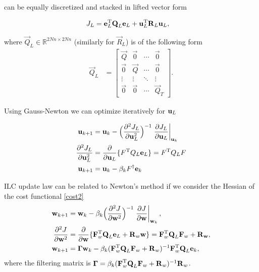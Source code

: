 \noindent can be equally discretized and stacked in lifted vector form

\begin{equation}
\begin{aligned}
J_L &= \boldsymbol{\mathrm{e}}_L^{\mathrm{T}}\boldsymbol{\mathrm{Q}}_L\boldsymbol{\mathrm{e}}_L + \boldsymbol{\mathrm{u}}_L^{\mathrm{T}}\boldsymbol{\mathrm{R}}_L\boldsymbol{\mathrm{u}}_L,
\end{aligned}
\label{costFunctional}
\end{equation}

\noindent where $\vec{Q}_L \in \mathbb{R}^{2Nn \times 2Nn}$ (similarly for $\vec{R}_L$) is of the following form
%
\begin{equation*}
\begin{aligned}
 \vec{Q}_L &= 
 \begin{bmatrix}
  \vec{Q} & \vec{0} & \cdots & \vec{0} \\
  \vec{0} & \vec{Q} & \cdots & \vec{0} \\
  \vdots  & \vdots  & \ddots & \vdots  \\
  \vec{0} & \vec{0} & \cdots & \vec{Q}_T
 \end{bmatrix}.
\end{aligned}
\end{equation*}

\noindent Using Gauss-Newton we can optimize iteratively for $\boldsymbol{\mathrm{u}}_L$

\begin{equation}
\begin{aligned}
\boldsymbol{\mathrm{u}}_{k+1} &= \boldsymbol{\mathrm{u}}_k - \Big(\frac{\partial^{2}J_L}{\partial\boldsymbol{\mathrm{u}}^{2}_L}\Big)^{-1}\left.\frac{\partial{J_L}}{\partial{\boldsymbol{\mathrm{u}}_L}}\right|_{\boldsymbol{\mathrm{u}}_k} \\
\frac{\partial^{2}J_L}{\partial\boldsymbol{\mathrm{u}}^{2}_L} &= \frac{\partial}{\partial\boldsymbol{\mathrm{u}}_L}\{F^{\mathrm{T}}Q_L\boldsymbol{\mathrm{e}}_L\} = F^{\mathrm{T}}Q_LF \\
\boldsymbol{\mathrm{u}}_{k+1} &= \boldsymbol{\mathrm{u}}_k - \beta_kF^{\dagger}\boldsymbol{\mathrm{e}}_k
\end{aligned}
\label{ILCnewtonsMethod}
\end{equation}

\noindent ILC update law can be related to Newton's method if we consider the Hessian of the cost functional \eqref{cost2}
%
\begin{equation}
\begin{aligned}
\boldsymbol{\mathrm{w}}_{k+1} &= \boldsymbol{\mathrm{w}}_k - \beta_k\Big(\frac{\partial^{2}J}{\partial\boldsymbol{\mathrm{w}}^{2}}\Big)^{-1}\left.\frac{\partial{J}}{\partial{\boldsymbol{\mathrm{w}}}}\right|_{\boldsymbol{\mathrm{w}}_k}, \\
\frac{\partial^{2}J}{\partial\boldsymbol{\mathrm{w}}^{2}} &= \frac{\partial}{\partial\boldsymbol{\mathrm{w}}}\{\boldsymbol{\mathrm{F}}_{w}^{\mathrm{T}}\boldsymbol{\mathrm{Q}}_L\boldsymbol{\mathrm{e}}_L + \boldsymbol{\mathrm{R}}_w\boldsymbol{\mathrm{w}}\} = \boldsymbol{\mathrm{F}}_{w}^{\mathrm{T}}\boldsymbol{\mathrm{Q}}_L\boldsymbol{\mathrm{F}}_{w} + \boldsymbol{\mathrm{R}}_{\boldsymbol{\mathrm{w}}}, \\
\boldsymbol{\mathrm{w}}_{k+1} &= \boldsymbol{\mathrm{\Gamma}}\boldsymbol{\mathrm{w}}_k - \beta_k(\boldsymbol{\mathrm{F}}_{w}^{\mathrm{T}}\boldsymbol{\mathrm{Q}}_L\boldsymbol{\mathrm{F}}_{w} + \boldsymbol{\mathrm{R}}_{w})^{-1}\boldsymbol{\mathrm{F}}_{w}^{\mathrm{T}}\boldsymbol{\mathrm{Q}}_L\boldsymbol{\mathrm{e}}_k,
\end{aligned}
\label{ILCWeightsNewtonsMethod}
\end{equation}
%
\noindent where the filtering matrix is $\boldsymbol{\mathrm{\Gamma}} = \beta_k(\boldsymbol{\mathrm{F}}_{w}^{\mathrm{T}}\boldsymbol{\mathrm{Q}}_L\boldsymbol{\mathrm{F}}_{w} + \boldsymbol{\mathrm{R}}_{w})^{-1}\boldsymbol{\mathrm{R}}_{w}$. 

